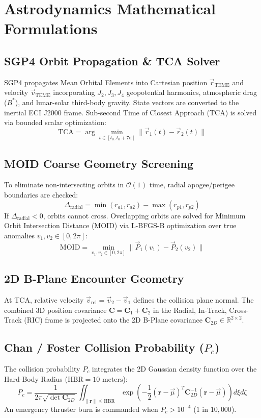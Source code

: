 \documentclass[10pt,twocolumn,a4paper]{article}
\begin{document}
\section{Astrodynamics Mathematical Formulations}

\subsection{SGP4 Orbit Propagation \& TCA Solver}
SGP4 propagates Mean Orbital Elements into Cartesian position $\vec{r}_{\text{TEME}}$ and velocity $\vec{v}_{\text{TEME}}$ incorporating $J_2, J_3, J_4$ geopotential harmonics, atmospheric drag ($B^*$), and lunar-solar third-body gravity. State vectors are converted to the inertial ECI J2000 frame. Sub-second Time of Closest Approach (TCA) is solved via bounded scalar optimization:
\begin{equation}
\text{TCA} = \arg\min_{t \in [t_0, t_0 + 7\text{d}]} \|\vec{r}_1(t) - \vec{r}_2(t)\|
\end{equation}

\subsection{MOID Coarse Geometry Screening}
To eliminate non-intersecting orbits in $\mathcal{O}(1)$ time, radial apogee/perigee boundaries are checked:
\begin{equation}
\Delta_{\text{radial}} = \min(r_{a1}, r_{a2}) - \max(r_{p1}, r_{p2})
\end{equation}
If $\Delta_{\text{radial}} < 0$, orbits cannot cross. Overlapping orbits are solved for Minimum Orbit Intersection Distance (MOID) via L-BFGS-B optimization over true anomalies $v_1, v_2 \in [0, 2\pi]$:
\begin{equation}
\text{MOID} = \min_{v_1, v_2 \in [0, 2\pi]} \|\vec{P}_1(v_1) - \vec{P}_2(v_2)\|
\end{equation}

\subsection{2D B-Plane Encounter Geometry}
At TCA, relative velocity $\vec{v}_{\text{rel}} = \vec{v}_2 - \vec{v}_1$ defines the collision plane normal. The combined 3D position covariance $\mathbf{C} = \mathbf{C}_1 + \mathbf{C}_2$ in the Radial, In-Track, Cross-Track (RIC) frame is projected onto the 2D B-Plane covariance $\mathbf{C}_{2D} \in \mathbb{R}^{2 \times 2}$.

\subsection{Chan / Foster Collision Probability ($P_c$)}
The collision probability $P_c$ integrates the 2D Gaussian density function over the Hard-Body Radius ($\text{HBR} = 10\text{ meters}$):
\begin{equation}
P_c = \frac{1}{2\pi \sqrt{\det \mathbf{C}_{2D}}} \iint_{\|\mathbf{r}\| \le \text{HBR}} \exp\left( -\frac{1}{2} (\mathbf{r} - \vec{\mu})^T \mathbf{C}_{2D}^{-1} (\mathbf{r} - \vec{\mu}) \right) d\xi d\zeta
\end{equation}
An emergency thruster burn is commanded when $P_c > 10^{-4}$ ($1\text{ in }10,000$).
\end{document}
